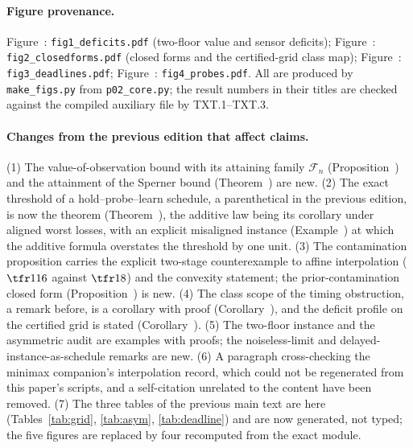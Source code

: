 \paragraph{Figure provenance.} Figure~: \texttt{fig1\_deficits.pdf} (two-floor value and sensor deficits); Figure~: \texttt{fig2\_closedforms.pdf} (closed forms and the certified-grid class map); Figure~: \texttt{fig3\_deadlines.pdf}; Figure~: \texttt{fig4\_probes.pdf}. All are produced by \texttt{make\_figs.py} from \texttt{p02\_core.py}; the result numbers in their titles are checked against the compiled auxiliary file by TXT.1--TXT.3.

\paragraph{Changes from the previous edition that affect claims.} (1) The value-of-observation bound  with its attaining family $\mathcal F_n$ (Proposition~) and the attainment of the Sperner bound (Theorem~) are new. (2) The exact threshold of a hold--probe--learn schedule, a parenthetical in the previous edition, is now the theorem (Theorem~), the additive law being its corollary under aligned worst losses, with an explicit misaligned instance (Example~) at which the additive formula overstates the threshold by one unit. (3) The contamination proposition carries the explicit two-stage counterexample to affine interpolation ($\tfr1{16}$ against $\tfr18$) and the convexity statement; the prior-contamination closed form (Proposition~) is new. (4) The class scope of the timing obstruction, a remark before, is a corollary with proof (Corollary~), and the deficit profile on the certified grid is stated (Corollary~). (5) The two-floor instance and the asymmetric audit are examples with proofs; the noiseless-limit and delayed-instance-as-schedule remarks are new. (6) A paragraph cross-checking the minimax companion's interpolation record, which could not be regenerated from this paper's scripts, and a self-citation unrelated to the content have been removed. (7) The three tables of the previous main text are here (Tables~\ref{tab:grid}, \ref{tab:asym}, \ref{tab:deadline}) and are now generated, not typed; the five figures are replaced by four recomputed from the exact module.
